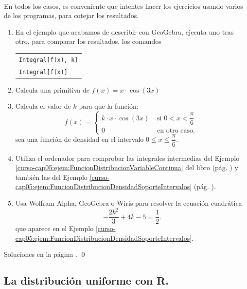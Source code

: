 \documentclass[10pt,a4paper]{article}\usepackage[]{graphicx}\usepackage[]{color}
\begin{document}
\begin{ejercicio}
\label{tut05:ejercicio16}
\quad\\
En todos los casos, es conveniente que intentes hacer los ejercicios usando varios de los programas, para cotejar los resultados.
\begin{enumerate}
  \item En el ejemplo que acabamos de describir con GeoGebra, ejecuta uno tras otro, para comparar los resultados, los comandos
  \begin{center}
  \begin{tabular}{l}
  {\tt Integral[f(x), k]}\\
  {\tt Integral[f(x)]}
  \end{tabular}
  \end{center}
  \item Calcula una primitiva de $f(x)=x\cdot\cos(3x)$
  \item Calcula el valor de $k$ para que la función:
    \[
        f(x)=\begin{cases}
        k\cdot x\cdot\cos(3x)&\mbox{ si }0<x<\dfrac{\pi}{6}\\
        0&\mbox{ en otro caso. }
        \end{cases}
    \]
    sea una función de densidad en el intervalo $0\leq x\leq\dfrac{\pi}{6}$.
  \item Utiliza el ordenador para comprobar las integrales intermedias del Ejemplo \ref{curso-cap05:ejem:FuncionDistribucionVariableContinua} del libro (pág. \pageref{curso-cap05:ejem:FuncionDistribucionVariableContinua}) y también las del Ejemplo \ref{curso-cap05:ejem:FuncionDistribucionDensidadSoporteIntervalos} (pág. \pageref{curso-cap05:ejem:FuncionDistribucionDensidadSoporteIntervalos}).
  \item Usa Wolfram Alpha, GeoGebra o Wiris para resolver la ecuación cuadrática
        \[-\dfrac{2 k^2}{3}+4 k-5=\dfrac{1}{2}.\]
        que aparece en el Ejemplo \ref{curso-cap05:ejem:FuncionDistribucionDensidadSoporteIntervalos}.
\end{enumerate}
Soluciones en la página \pageref{tut05:ejercicio16:sol}.
\qed
\end{ejercicio}

\subsection{La distribución uniforme con R.}
\label{tut05:subsubsec:DistribucionUniformeR}
\end{document}
